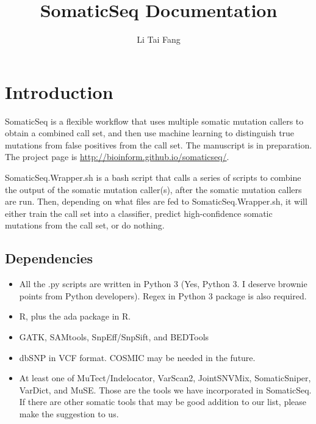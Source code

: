 \documentclass[10pt,letterpaper]{article}
\author{Li Tai Fang}
\title{SomaticSeq Documentation}
\begin{document}
\maketitle



\begin{sloppypar}




\section{Introduction}

SomaticSeq is a flexible workflow that uses multiple somatic mutation callers to obtain a combined call set, and then use machine learning to distinguish true mutations from false positives from the call set. The manuscript is in preparation. The project page is \href{http://bioinform.github.io/somaticseq/}{http://bioinform.github.io/somaticseq/}. 

SomaticSeq.Wrapper.sh is a bash script that calls a series of scripts to combine the output of the somatic mutation caller(s), after the somatic mutation callers are run. Then, depending on what files are fed to SomaticSeq.Wrapper.sh, it will either train the call set into a classifier, predict high-confidence somatic mutations from the call set, or do nothing. 

\subsection{Dependencies}

\begin{itemize}

\item
All the .py scripts are written in Python 3 (Yes, Python 3. I deserve brownie points from Python developers). Regex in Python 3 package is also required. 

\item
R, plus the ada package in R.

\item
GATK, SAMtools, SnpEff/SnpSift, and BEDTools

\item
dbSNP in VCF format. COSMIC may be needed in the future.

\item
At least one of MuTect/Indelocator, VarScan2, JointSNVMix, SomaticSniper, VarDict, and MuSE. Those are the tools we have incorporated in SomaticSeq. If there are other somatic tools that may be good addition to our list, please make the suggestion to us. 


\end{itemize}
\end{sloppypar}
\end{document}
